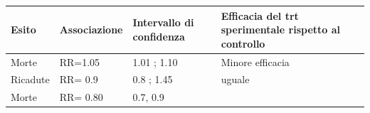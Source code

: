 \documentclass[]{book}
\begin{document}
\begin{longtable}[]{@{}llll@{}}
\toprule
\begin{minipage}[b]{0.22\columnwidth}\raggedright
Esito\strut
\end{minipage} & \begin{minipage}[b]{0.22\columnwidth}\raggedright
Associazione\strut
\end{minipage} & \begin{minipage}[b]{0.22\columnwidth}\raggedright
Intervallo di confidenza\strut
\end{minipage} & \begin{minipage}[b]{0.22\columnwidth}\raggedright
Efficacia del trt sperimentale rispetto al controllo\strut
\end{minipage}\tabularnewline
\midrule
\endhead
\begin{minipage}[t]{0.22\columnwidth}\raggedright
Morte\strut
\end{minipage} & \begin{minipage}[t]{0.22\columnwidth}\raggedright
RR=1.05\strut
\end{minipage} & \begin{minipage}[t]{0.22\columnwidth}\raggedright
1.01 ; 1.10\strut
\end{minipage} & \begin{minipage}[t]{0.22\columnwidth}\raggedright
Minore efficacia\strut
\end{minipage}\tabularnewline
\begin{minipage}[t]{0.22\columnwidth}\raggedright
Ricadute\strut
\end{minipage} & \begin{minipage}[t]{0.22\columnwidth}\raggedright
RR= 0.9\strut
\end{minipage} & \begin{minipage}[t]{0.22\columnwidth}\raggedright
0.8 ; 1.45\strut
\end{minipage} & \begin{minipage}[t]{0.22\columnwidth}\raggedright
uguale\strut
\end{minipage}\tabularnewline
\begin{minipage}[t]{0.22\columnwidth}\raggedright
Morte\strut
\end{minipage} & \begin{minipage}[t]{0.22\columnwidth}\raggedright
RR= 0.80\strut
\end{minipage} & \begin{minipage}[t]{0.22\columnwidth}\raggedright
0.7, 0.9\strut
\end{minipage} & \begin{minipage}[t]{0.22\columnwidth}\raggedright

\end{minipage}
\end{longtable}
\end{document}
